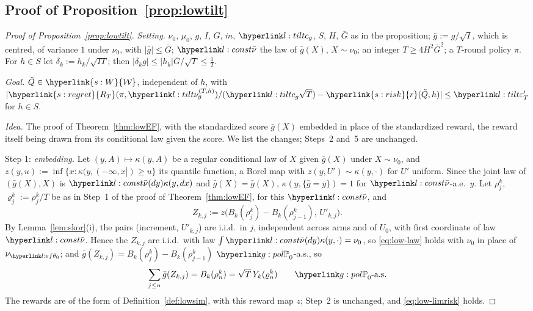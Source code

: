 \documentclass[11pt]{article}
\DeclareRobustCommand{\sy}[2]{{\hyperlink{#1}{#2}}}
\newcommand{\1}{\mathbf{1}}
\newcommand{\RT}{\sy{s:regret}{R_T}}
\newcommand{\Wc}{\sy{s:W}{\mathcal W}}
\newcommand{\rk}{\sy{s:risk}{r}}
\begin{document}
\subsection{Proof of Proposition~\ref{prop:lowtilt}}\label{sec:app-low-prooftilt}

\begin{proof}[Proof of Proposition~\ref{prop:lowtilt}]
\textit{Setting.} $\nu_0$, $\mu_0$, $g$, $I$, $G$, $\dot m$, $\lcg$, $S$, $H$, $\bar G$ as in the proposition; $\bar g:=g/\sqrt I$, which is centred, of variance $1$ under $\nu_0$,
with $|\bar g|\le\bar G$; $\lnub$ the law of $\bar g(X)$, $X\sim\nu_0$; an integer $T\ge4H^2\bar G^2$; a $T$-round policy $\pi$. For $h\in S$ let $\delta_k:=h_k/\sqrt{IT}$;
then $|\delta_kg|\le|h_k|\bar G/\sqrt T\le\frac12$.

\textit{Goal.} $\tilde Q\in\Wc$, independent of $h$, with $|\RT(\pi,\lnug)/(\lcg\sqrt T)-\rk(\tilde Q,h)|\le\lepTp$ for $h\in S$.

\textit{Idea.} The proof of Theorem~\ref{thm:lowEF}, with the standardized score $\bar g(X)$ embedded in place of the standardized reward, the reward itself being drawn from its
conditional law given the score. We list the changes; Steps~2 and~5 are unchanged.

Step 1: \emph{embedding.} Let $(y,A)\mapsto\kappa(y,A)$ be a regular conditional law of $X$ given $\bar g(X)$ under $X\sim\nu_0$, and $z(y,u):=\inf\{x:\kappa(y,(-\infty,x])\ge u\}$
its quantile function, a Borel map with $z(y,U')\sim\kappa(y,\cdot)$ for $U'$ uniform. Since the joint law of $(\bar g(X),X)$ is $\lnub(dy)\kappa(y,dx)$ and $\bar g(X)=\bar g(X)$,
$\kappa(y,\{\bar g=y\})=1$ for $\lnub$-a.e.\ $y$. Let $\rho^k_j$, $\varrho^k_j:=\rho^k_j/T$ be as in Step~1 of the proof of Theorem~\ref{thm:lowEF}, for this $\lnub$, and
\[
Z_{k,j}:=z\big(B_k(\rho^k_j)-B_k(\rho^k_{j-1}),\,U'_{k,j}\big).
\]
By Lemma~\ref{lem:skor}(i), the pairs (increment, $U'_{k,j}$) are i.i.d.\ in $j$, independent across arms and of $U_0$, with first coordinate of law $\lnub$. Hence the $Z_{k,j}$
are i.i.d.\ with law $\int\lnub(dy)\kappa(y,\cdot)=\nu_0$, so \eqref{eq:low-law} holds with $\nu_0$ in place of $\nu_{\lthz}$; and $\bar g(Z_{k,j})=B_k(\rho^k_j)-B_k(\rho^k_{j-1})$
$\gPh_0$-a.s., so
\[
\sum_{j\le n}\bar g(Z_{k,j})=B_k(\rho^k_n)=\sqrt T\,Y_k(\varrho^k_n)\qquad\gPh_0\text{-a.s.}
\]
The rewards are of the form of Definition~\ref{def:lowsim}, with this reward map $z$; Step~2 is unchanged, and \eqref{eq:low-limrisk} holds.


\end{proof}
\end{document}
